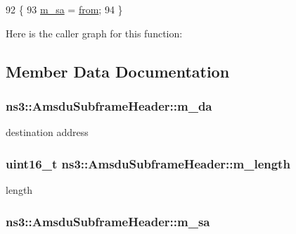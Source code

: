 \begin{DoxyCode}
92 \{
93   \hyperlink{classns3_1_1AmsduSubframeHeader_a5a466a28217906fb51eef59c1aa75e9b}{m\_sa} = \hyperlink{lte__amc_8m_a1b4c81ff74eb1a626b5ade44c81004b3}{from};
94 \}
\end{DoxyCode}


Here is the caller graph for this function\+:




\subsection{Member Data Documentation}
\subsubsection[{\texorpdfstring{m\+\_\+da}{m_da}}]{ ns3\+::\+Amsdu\+Subframe\+Header\+::m\+\_\+da\hspace{0.3cm}{\ttfamily [private]}}\hypertarget{classns3_1_1AmsduSubframeHeader_a793d99a78d90657d3c38db92747f969b}{}\label{classns3_1_1AmsduSubframeHeader_a793d99a78d90657d3c38db92747f969b}


destination address 

\subsubsection[{\texorpdfstring{m\+\_\+length}{m_length}}]{\setlength{\rightskip}{0pt plus 5cm}uint16\+\_\+t ns3\+::\+Amsdu\+Subframe\+Header\+::m\+\_\+length\hspace{0.3cm}{\ttfamily [private]}}\hypertarget{classns3_1_1AmsduSubframeHeader_a65dd60738ed7dae4bb4157dd05441ec1}{}\label{classns3_1_1AmsduSubframeHeader_a65dd60738ed7dae4bb4157dd05441ec1}


length 

\subsubsection[{\texorpdfstring{m\+\_\+sa}{m_sa}}]{ ns3\+::\+Amsdu\+Subframe\+Header\+::m\+\_\+sa\hspace{0.3cm}{\ttfamily [private]}}\hypertarget{classns3_1_1AmsduSubframeHeader_a5a466a28217906fb51eef59c1aa75e9b}{}\label{classns3_1_1AmsduSubframeHeader_a5a466a28217906fb51eef59c1aa75e9b}


